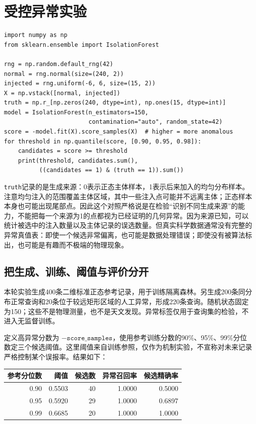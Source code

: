 \section{受控异常实验}
\begin{lstlisting}[caption={人工生成二维数据上的异常检测（仅用于方法实验）}]
import numpy as np
from sklearn.ensemble import IsolationForest

rng = np.random.default_rng(42)
normal = rng.normal(size=(240, 2))
injected = rng.uniform(-6, 6, size=(15, 2))
X = np.vstack([normal, injected])
truth = np.r_[np.zeros(240, dtype=int), np.ones(15, dtype=int)]
model = IsolationForest(n_estimators=150,
                        contamination="auto", random_state=42)
score = -model.fit(X).score_samples(X)  # higher = more anomalous
for threshold in np.quantile(score, [0.90, 0.95, 0.98]):
    candidates = score >= threshold
    print(threshold, candidates.sum(),
          ((candidates == 1) & (truth == 1)).sum())
\end{lstlisting}

\texttt{truth}记录的是生成来源：0表示正态主体样本，1表示后来加入的均匀分布样本。注意均匀注入的范围覆盖主体区域，其中一些注入点可能并不远离主体；正态样本本身也可能出现尾部点。因此这个对照严格说是在检验“识别不同生成来源”的能力，不能把每一个来源为1的点都视为已经证明的几何异常。因为来源已知，可以统计被选中的注入数量以及主体记录的误选数量。但真实科学数据通常没有完整的异常真值表：即使一个候选非常偏离，也可能是数据处理错误；即使没有被算法标出，也可能是有趣而不极端的物理现象。


\subsection{把生成、训练、阈值与评价分开}
本轮实验生成400条二维标准正态参考记录，用于训练隔离森林。另生成200条同分布正常查询和20条位于较远矩形区域的人工异常，形成220条查询。随机状态固定为150；这些不是物理测量，也不是天文发现。异常标签仅用于查询集的检验，不进入无监督训练。

定义高异常分数为 $-\texttt{score\_samples}$，使用参考训练分数的90\%、95\%、99\%分位数定三个候选阈值。这里阈值来自训练参照，仅作为机制实验，不宣称对未来记录严格控制某个误报率。结果如下：
\begin{center}\small
\begin{tabular}{rrrrr}\toprule
参考分位数&阈值&候选数&异常召回率&候选精确率\\\midrule
0.90&0.5503&40&1.0000&0.5000\\
0.95&0.5920&29&1.0000&0.6897\\
0.99&0.6685&20&1.0000&1.0000\\\bottomrule
\end{tabular}\end{center}

